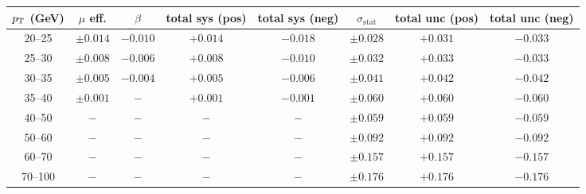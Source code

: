 \begin{tabular}{c|cc|cc|c|cc}
$p_\text{T}$ (GeV)  & $\mu$ eff. & $\beta$ & total sys (pos) & total sys (neg) & $\sigma_{\text{stat}}$ & total unc (pos) & total unc (neg) \\
\hline
20--25 & $\pm0.014$ & $-0.010$ & $+0.014$ & $-0.018$ & $\pm0.028$ & $+0.031$ & $-0.033$\\
25--30 & $\pm0.008$ & $-0.006$ & $+0.008$ & $-0.010$ & $\pm0.032$ & $+0.033$ & $-0.033$\\
30--35 & $\pm0.005$ & $-0.004$ & $+0.005$ & $-0.006$ & $\pm0.041$ & $+0.042$ & $-0.042$\\
35--40 & $\pm0.001$ & $-$ & $+0.001$ & $-0.001$ & $\pm0.060$ & $+0.060$ & $-0.060$\\
40--50 & $-$ & $-$ & $-$ & $-$ & $\pm0.059$ & $+0.059$ & $-0.059$\\
50--60 & $-$ & $-$ & $-$ & $-$ & $\pm0.092$ & $+0.092$ & $-0.092$\\
60--70 & $-$ & $-$ & $-$ & $-$ & $\pm0.157$ & $+0.157$ & $-0.157$\\
70--100 & $-$ & $-$ & $-$ & $-$ & $\pm0.176$ & $+0.176$ & $-0.176$\\
\end{tabular}
